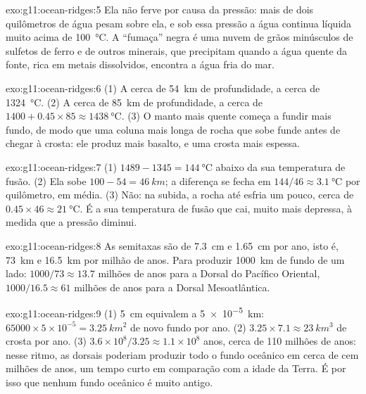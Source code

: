 \begin{solution}{exo:g11:ocean-ridges:5}
Ela não ferve por causa da pressão: mais de dois quilômetros de água pesam
sobre ela, e sob essa pressão a água continua líquida muito acima de
\qty{100}{\celsius}. A ``fumaça'' negra é uma nuvem de grãos minúsculos de
sulfetos de ferro e de outros minerais, que precipitam quando a água quente
da fonte, rica em metais dissolvidos, encontra a água fria do mar.
\end{solution}

\begin{solution}{exo:g11:ocean-ridges:6}
(1) A cerca de \qty{54}{km} de profundidade, a cerca de \qty{1324}{\celsius}.
(2) A cerca de \qty{85}{km} de profundidade, a cerca de $1400 + 0.45 \times 85 \approx
\qty{1438}{\celsius}$. (3) O manto mais quente começa a fundir mais fundo, de
modo que uma coluna mais longa de rocha que sobe funde antes de chegar à
crosta: ele produz mais basalto, e uma crosta mais espessa.
\end{solution}

\begin{solution}{exo:g11:ocean-ridges:7}
(1) $1489 - 1345 = \qty{144}{\celsius}$ abaixo da sua temperatura de fusão.
(2) Ela sobe $100 - 54 = \qty{46}{km}$; a diferença se fecha em
$144/46 \approx \qty{3.1}{\celsius}$ por quilômetro, em média. (3) Não: na
subida, a rocha até esfria um pouco, cerca de $0.45 \times 46 \approx
\qty{21}{\celsius}$. É a sua temperatura de fusão que cai, muito mais
depressa, à medida que a pressão diminui.
\end{solution}

\begin{solution}{exo:g11:ocean-ridges:8}
As semitaxas são de \qty{7.3}{cm} e \qty{1.65}{cm} por ano, isto é,
\qty{73}{km} e \qty{16.5}{km} por milhão de anos. Para produzir
\qty{1000}{km} de fundo de um lado: $1000/73 \approx 13.7$ milhões de anos
para a Dorsal do Pacífico Oriental, $1000/16.5 \approx 61$ milhões de anos
para a Dorsal Mesoatlântica.
\end{solution}

\begin{solution}{exo:g11:ocean-ridges:9}
(1) \qty{5}{cm} equivalem a \qty{5e-5}{km}: $65000 \times 5 \times 10^{-5} =
\qty{3.25}{km^2}$ de novo fundo por ano. (2) $3.25 \times 7.1 \approx
\qty{23}{km^3}$ de crosta por ano. (3) $3.6 \times 10^8 / 3.25 \approx 1.1
\times 10^8$ anos, cerca de 110 milhões de anos: nesse ritmo, as dorsais
poderiam produzir todo o fundo oceânico em cerca de cem milhões de anos, um
tempo curto em comparação com a idade da Terra. É por isso que nenhum fundo
oceânico é muito antigo.
\end{solution}

